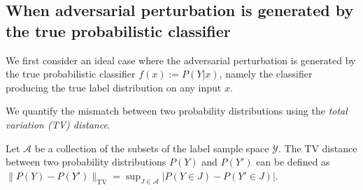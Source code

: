 

       
    \subsection{When adversarial perturbation is generated by the true probabilistic classifier}
    \label{sect:reason-true}
    We first consider an ideal case where the adversarial perturbation is generated by the true probabilistic classifier $f(x):= P(Y|x)$, namely the classifier producing the true label distribution on any input $x$.
        
    

    
    We quantify the mismatch between two probability distributions using the \emph{total variation (TV) distance}.
    \begin{definition}[TV distance]
    \label{definition:total-variation-distance}
    Let $\mathcal{A}$ be a collection of the subsets of the label sample space $\mathcal{Y}$. The TV distance between two probability distributions $P(Y)$ and $P(Y')$ can be defined as $
       \|P(Y) - P(Y')\|_{\text{TV}} = \sup_{J\in \mathcal{A}} \left| P(Y\in J) - P(Y'\in J)\right| 
      $.
    \end{definition}
    
